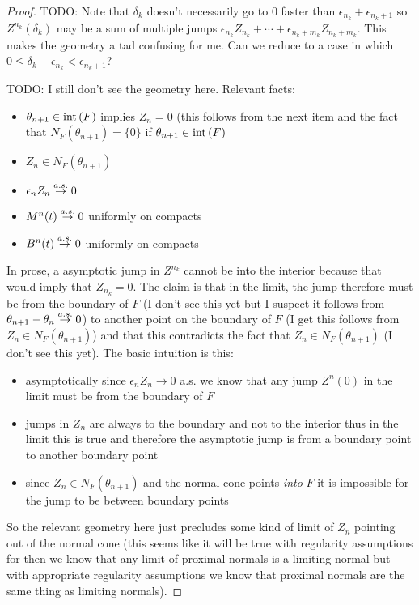 \begin{proof}
TODO: Note that $\delta_k$ doesn't necessarily go to 0 faster than $\epsilon_{n_k} + \epsilon_{n_k + 1}$ so $Z^{n_k}(\delta_k)$ may be a sum of multiple jumps $\epsilon_{n_k} Z_{n_k} + \dotsb + \epsilon_{n_k + m_k} Z_{n_k + m_k}$.  This makes the geometry a tad confusing for me.  Can we reduce to a case in which $0 \leq \delta_k + \epsilon_{n_k} < \epsilon_{n_k+1}$?


TODO: I still don't see the geometry here.  Relevant facts: 
\begin{itemize}
\item $\theta_{n+1} \in \operatorname*{int} \left( F \right)$ implies $Z_n = 0$ (this follows from the next item and the fact that $N_F(\theta_{n+1}) = \lbrace 0 \rbrace$ if $\theta_{n+1} \in \operatorname*{int} \left( F \right)$
\item $Z_n \in N_F(\theta_{n+1})$
\item $\epsilon_n Z_n \overset{a.s.}\to 0$
\item $M^n(t) \overset{a.s.}\to 0$ uniformly on compacts
\item $B^n(t) \overset{a.s.}\to 0$ uniformly on compacts
\end{itemize}
In prose, a asymptotic jump in $Z^{n_k}$ cannot be into the interior because that would imply that $Z_{n_k} = 0$.  The claim is that in the limit, the jump therefore must be from the boundary of $F$ (I don't see this yet but I suspect it follows from $\theta_{n+1} - \theta_n \overset{a.s.}\to 0$) to another point on the boundary of $F$ (I get this follows from $Z_n \in N_F(\theta_{n+1})$) and that this contradicts the fact that $Z_n \in N_F(\theta_{n+1})$ (I don't see this yet).  The basic intuition is this: 
\begin{itemize}
\item asymptotically since $\epsilon_n Z_n \to 0$ a.s. we know that any jump $Z^n(0)$ in the limit must be from the boundary of $F$
\item jumps in $Z_n$ are always to the boundary and not to the interior thus in the limit this is true and therefore the asymptotic jump is from a boundary point to another boundary point
\item since $Z_n \in N_F(\theta_{n+1})$ and the normal cone points \emph{into} $F$ it is impossible for the jump to be between boundary points
\end{itemize}
So the relevant geometry here just precludes some kind of limit of $Z_n$ pointing out of the normal cone (this seems like it will be true with regularity assumptions for then we know that any limit of proximal normals is a limiting normal but with appropriate regularity assumptions we know that proximal normals are the same thing as limiting normals).


\end{proof}
